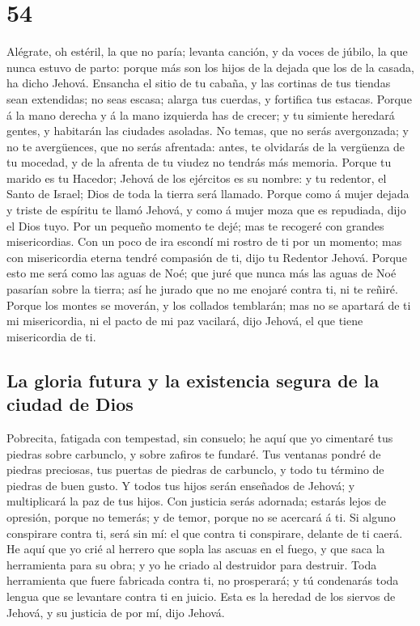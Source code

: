 \hypertarget{section-53}{%
\section{54}\label{section-53}}

 Alégrate, oh estéril, la que no paría; levanta canción, y
da voces de júbilo, la que nunca estuvo de parto: porque más son los
hijos de la dejada que los de la casada, ha dicho Jehová. 
Ensancha el sitio de tu cabaña, y las cortinas de tus tiendas sean
extendidas; no seas escasa; alarga tus cuerdas, y fortifica tus estacas.
 Porque á la mano derecha y á la mano izquierda has de
crecer; y tu simiente heredará gentes, y habitarán las ciudades
asoladas.  No temas, que no serás avergonzada; y no te
avergüences, que no serás afrentada: antes, te olvidarás de la vergüenza
de tu mocedad, y de la afrenta de tu viudez no tendrás más memoria.
 Porque tu marido es tu Hacedor; Jehová de los ejércitos es
su nombre: y tu redentor, el Santo de Israel; Dios de toda la tierra
será llamado.  Porque como á mujer dejada y triste de
espíritu te llamó Jehová, y como á mujer moza que es repudiada, dijo el
Dios tuyo.  Por un pequeño momento te dejé; mas te recogeré
con grandes misericordias.  Con un poco de ira escondí mi
rostro de ti por un momento; mas con misericordia eterna tendré
compasión de ti, dijo tu Redentor Jehová.  Porque esto me
será como las aguas de Noé; que juré que nunca más las aguas de Noé
pasarían sobre la tierra; así he jurado que no me enojaré contra ti, ni
te reñiré.  Porque los montes se moverán, y los collados
temblarán; mas no se apartará de ti mi misericordia, ni el pacto de mi
paz vacilará, dijo Jehová, el que tiene misericordia de ti.

\hypertarget{la-gloria-futura-y-la-existencia-segura-de-la-ciudad-de-dios}{%
\subsection{La gloria futura y la existencia segura de la ciudad de
Dios}\label{la-gloria-futura-y-la-existencia-segura-de-la-ciudad-de-dios}}

 Pobrecita, fatigada con tempestad, sin consuelo; he aquí
que yo cimentaré tus piedras sobre carbunclo, y sobre zafiros te
fundaré.  Tus ventanas pondré de piedras preciosas, tus
puertas de piedras de carbunclo, y todo tu término de piedras de buen
gusto.  Y todos tus hijos serán enseñados de Jehová; y
multiplicará la paz de tus hijos.  Con justicia serás
adornada; estarás lejos de opresión, porque no temerás; y de temor,
porque no se acercará á ti.  Si alguno conspirare contra
ti, será sin mí: el que contra ti conspirare, delante de ti caerá.
 He aquí que yo crié al herrero que sopla las ascuas en el
fuego, y que saca la herramienta para su obra; y yo he criado al
destruidor para destruir.  Toda herramienta que fuere
fabricada contra ti, no prosperará; y tú condenarás toda lengua que se
levantare contra ti en juicio. Esta es la heredad de los siervos de
Jehová, y su justicia de por mí, dijo Jehová.

